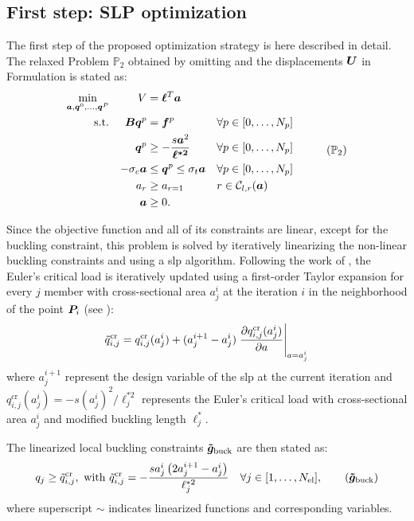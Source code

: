 \subsection{First step: SLP optimization}
The first step of the proposed optimization strategy is here described in detail. The relaxed Problem $\mathbb{P}_2$ obtained by omitting  and the displacements $\bm{U}$ in Formulation  is stated as:
\begin{equation}
    \begin{aligned}
    \min_{\vect{a}, \vect{q}^0, \dots, \vect{q}^P}  && V &= \vect{\ell}^{T}\vect{a}\\
    \textrm{s.t.}   && \matr{B}\vect{q}^p &= \vect{f}^p && \forall p \in [0,\dots,N_p]\\
    && \vect{q}^p &\geq -\frac{s\vect{a}^2}{\vect{\ell^{*2}}} && \forall p \in [0,\dots,N_p] \\
    && -\sigma_c\vect{a} &\leq \vect{q}^p \leq \sigma_t\vect{a} && \forall p \in [0,\dots,N_p] \\
    && a_{r}&\geq a_{r=1} && r \in \mathcal{C}_{l,r}(\vect{a}) \\
    && \vect{a} &\geq 0. \\
    \end{aligned}
    \tag{$\mathbb{P}_2$}
    \label{eq:optim_no_constr}
\end{equation}

Since the objective function and all of its constraints are linear, except for the buckling constraint, this problem is solved by iteratively linearizing the non-linear buckling constraints and using a \gls{slp} algorithm. Following the work of , the Euler's critical load is iteratively updated using a first-order Taylor expansion for every $j$ member with cross-sectional area $a_{j}^i$ at the iteration $i$ in the neighborhood of the point $\bm{P}_{i}$ (see ):
\begin{equation}
    \tilde{q}_{i,j}^{\text{cr}} = q_{i,j}^{\text{cr}}(a_{j}^i) + (a_{j}^{i+1} - a_{j}^i)\left.\frac{\partial q_{i,j}^{\text{cr}}(a_{j}^i)}{\partial a}\right\rvert_{a=a_{j}^i}
\end{equation}
where $a_{j}^{i+1}$ represent the design variable of the \gls{slp} at the current iteration and $q^{\text{cr}}_{i,j}(a_{j}^i) = -s ({a_{j}^i})^2/\ell^{*2}_j$ represents the Euler's critical load with cross-sectional area $a_{j}^i$ and modified buckling length $\ell^{*}_j$. 

The linearized local buckling constraints $\bm{\tilde{g}}_{\textrm{buck}}$ are then stated as:
\begin{equation}
    q_{j} \geq \tilde{q}^{\text{cr}}_{i,j},\text{ with } \tilde{q}^{\text{cr}}_{i,j}= - \frac{s a_{j}^i\left(2 a_{j}^{i+1} - a_{j}^i\right)}{\ell^{*2}_j} \quad \forall j \in [1,\ldots, N_{\text{el}}],
    \label{eq:buck_con_lin}
    \tag{$\vect{\tilde{g}}_{\textrm{buck}}$}
\end{equation}
where superscript $\sim$ indicates linearized functions and corresponding variables.

